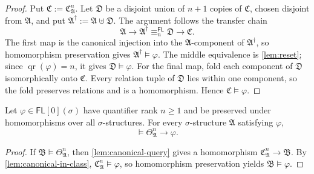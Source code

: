 \documentclass{lmcs}
\newcommand{\FL}{\mathsf{FL}}
\newcommand{\qr}{\operatorname{qr}}
\newcommand{\A}{\mathfrak{A}}
\newcommand{\B}{\mathfrak{B}}
\newcommand{\C}{\mathfrak{C}}
\newcommand{\D}{\mathfrak{D}}
\begin{document}
\begin{proof}
Put $\C:=\C_{\A}^{n}$.  Let $\D$ be a disjoint union of $n+1$ copies of
$\C$, chosen disjoint from $\A$, and put $\A^{\dagger}:=\A\uplus\D$.
The argument follows the transfer chain
\[
   \A\longrightarrow\A^{\dagger}
   \equiv_n^{\FL}\D
   \longrightarrow\C.
\]
The first map is the canonical injection into the $\A$-component of
$\A^{\dagger}$, so homomorphism preservation gives
$\A^{\dagger}\models\varphi$.  The middle equivalence is
\cref{lem:reset}; since $\qr(\varphi)=n$, it gives $\D\models\varphi$.
For the final map, fold each component of $\D$ isomorphically onto $\C$.
Every relation tuple of $\D$ lies within one component, so the fold preserves
relations and is a homomorphism.  Hence $\C\models\varphi$.
\end{proof}

\begin{cor}\label{cor:theta-entails}
Let $\varphi\in\FL[0](\sigma)$ have quantifier rank $n\geq1$ and be preserved
under homomorphisms over all $\sigma$-structures.  For every
$\sigma$-structure $\A$ satisfying $\varphi$,
\[
   \models\Theta_{\A}^{n}\rightarrow\varphi.
\]
\end{cor}

\begin{proof}
If $\B\models\Theta_{\A}^{n}$, then \cref{lem:canonical-query} gives a
homomorphism $\C_{\A}^{n}\to\B$.  By \cref{lem:canonical-in-class},
$\C_{\A}^{n}\models\varphi$, so homomorphism preservation yields
$\B\models\varphi$.
\end{proof}
\end{document}
